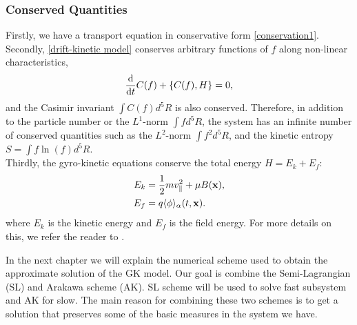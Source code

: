 \subsubsection{Conserved Quantities}
Firstly, we have a transport equation in conservative form \eqref{conservation1}. Secondly, \eqref{drift-kinetic model} conserves arbitrary functions of $f$  along non-linear characteristics,
\begin{equation}
\frac{\text{d}}{\text{d} t} C(f) + \left\{ C(f), H \right\} =0,
\end{equation}
and the Casimir invariant $\int C( f ) d^5R$ is also conserved. Therefore, in addition to the particle number or the $L^1$-norm $\int f d^5R$, the system has an infinite number of conserved quantities such as the $L^2$-norm $\int f^2 d^5R$, and the kinetic entropy $S=\int f \ln(f) d^5R$.\\
Thirdly, the gyro-kinetic equations conserve the total energy $H = E_k + E_f$:
\begin{subequations}
	\begin{align}
		E_k &= \frac{1}{2} m v_\parallel^2 + \mu B(\mathbf{x}),\\
		E_f &= q \langle \phi \rangle_\alpha (t,\mathbf{x}).
	\end{align}
\end{subequations}
where $E_k$ is the kinetic energy and $E_f$ is the field energy. For more details on this, we refer the reader to \cite{idomura2008conservative}.

In the next chapter we will explain the numerical scheme used to obtain the approximate solution of the GK model. Our goal is combine the Semi-Lagrangian (SL) and Arakawa scheme (AK). SL scheme will be used to solve fast subsystem and AK for slow. The main reason for combining these two schemes is to get a solution that preserves some of the basic measures in the system we have.